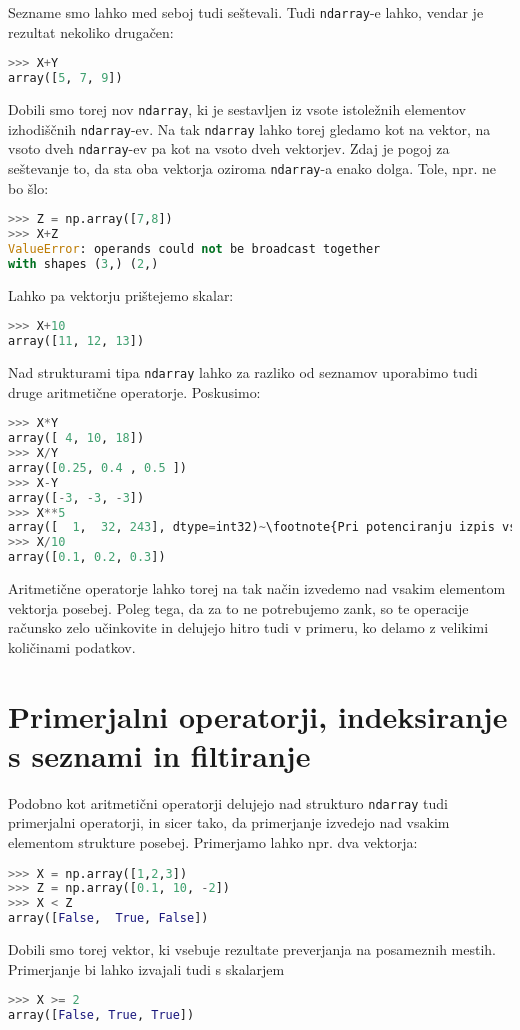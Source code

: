 Sezname smo lahko med seboj tudi seštevali. Tudi \texttt{ndarray}-e lahko, vendar je rezultat nekoliko drugačen:
\begin{lstlisting}[language=Python]
>>> X+Y
array([5, 7, 9])
\end{lstlisting}
Dobili smo torej nov \texttt{ndarray}, ki je sestavljen iz vsote istoležnih elementov izhodiščnih \texttt{ndarray}-ev. Na tak \texttt{ndarray} lahko torej gledamo kot na vektor, na vsoto dveh \texttt{ndarray}-ev pa kot na vsoto dveh vektorjev. Zdaj je pogoj za seštevanje to, da sta oba vektorja oziroma \texttt{ndarray}-a enako dolga. Tole, npr. ne bo šlo:
\begin{lstlisting}[language=Python]
>>> Z = np.array([7,8])
>>> X+Z
ValueError: operands could not be broadcast together
with shapes (3,) (2,) 
\end{lstlisting}
Lahko pa vektorju prištejemo skalar:
\begin{lstlisting}[language=Python]
>>> X+10
array([11, 12, 13]) 
\end{lstlisting}
Nad strukturami tipa \texttt{ndarray} lahko za razliko od seznamov uporabimo tudi druge aritmetične operatorje. Poskusimo:
\begin{lstlisting}[language=Python,escapechar=~]
>>> X*Y
array([ 4, 10, 18])
>>> X/Y
array([0.25, 0.4 , 0.5 ])
>>> X-Y
array([-3, -3, -3])
>>> X**5
array([  1,  32, 243], dtype=int32)~\footnote{Pri potenciranju izpis vsebuje tudi atribut \texttt{dtype}, ki podaja podatkovni tip rezultata. V tem primeru je to 32-bitni \texttt{int}. Tak rezultat smo sicer dobili tudi pri množenju, odštevanju in seštevanju, le da Python v teh primerih tega ni posebej izpisal. Atribut je spremenljivka, ki pripada določenemu objektu, podobno kot je metoda funkcija, ki pripada določenemu objektu.}~
>>> X/10
array([0.1, 0.2, 0.3])
\end{lstlisting}
Aritmetične operatorje lahko torej na tak način izvedemo nad vsakim elementom vektorja posebej. Poleg tega, da za to ne potrebujemo zank, so te operacije računsko zelo učinkovite in delujejo hitro tudi v primeru, ko delamo z velikimi količinami podatkov. 

\section{Primerjalni operatorji, indeksiranje s seznami in filtiranje}

Podobno kot aritmetični operatorji delujejo nad strukturo  \texttt{ndarray} tudi primerjalni operatorji, in sicer tako, da primerjanje izvedejo nad vsakim elementom strukture posebej. Primerjamo lahko npr. dva vektorja:
\begin{lstlisting}[language=Python]
>>> X = np.array([1,2,3])
>>> Z = np.array([0.1, 10, -2])
>>> X < Z
array([False,  True, False])
\end{lstlisting}
Dobili smo torej vektor, ki vsebuje rezultate preverjanja na posameznih mestih. Primerjanje bi lahko izvajali tudi s skalarjem
\begin{lstlisting}[language=Python]
>>> X >= 2
array([False, True, True])
\end{lstlisting}

